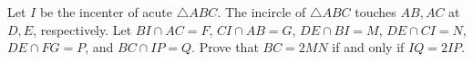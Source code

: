 Let $I$ be the incenter of acute $\triangle{ABC}$. The incircle of $\triangle{ABC}$ touches $AB,AC$ at $D,E$, respectively. Let $BI\cap AC=F$, $CI\cap AB=G$, $DE\cap BI=M$, $DE\cap CI=N$, $DE\cap FG=P$, and $BC\cap IP=Q$. Prove that $BC=2MN$ if and only if $IQ=2IP$.
